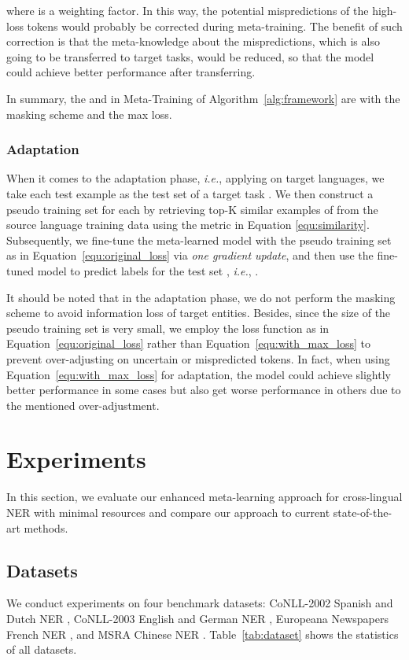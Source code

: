 \documentclass[letterpaper]{article} \usepackage{aaai20}  \usepackage{times}  \usepackage{helvet} \usepackage{courier}  \usepackage[hyphens]{url}  \usepackage{graphicx} \urlstyle{rm} \def\UrlFont{\rm}  \usepackage{graphicx}
\newcommand{\ie}{\textit{i.e.}}
\begin{document}
where  is a weighting factor. In this way, the potential mispredictions of the high-loss tokens would probably be corrected during meta-training. 
The benefit of such correction is that the meta-knowledge about the mispredictions, which is also going to be transferred to target tasks, would be reduced, so that the model could achieve better performance after transferring.

In summary, the  and  in Meta-Training of Algorithm~\ref{alg:framework} are with the masking scheme and the max loss.
\subsubsection{Adaptation}
When it comes to the adaptation phase, \ie, applying  on target languages, we take each test example  as the test set  of a target task . 
We then construct a pseudo training set  for each  by retrieving top-K similar examples of  from the source language training data  using the metric in Equation \ref{equ:similarity}. 
Subsequently, we fine-tune the meta-learned model  with the pseudo training set  as in Equation~\ref{equ:original_loss}  via \textit{one gradient update}, and then use the fine-tuned model to predict labels for the test set , \ie, . 

It should be noted that in the adaptation phase, we do not perform the masking scheme to avoid information loss of target entities. 
Besides, since the size of the pseudo training set is very small, we employ the loss function as in Equation~\ref{equ:original_loss} rather than Equation~\ref{equ:with_max_loss} to prevent over-adjusting on uncertain or mispredicted tokens. 
In fact, when using Equation~\ref{equ:with_max_loss} for adaptation, the model could achieve slightly better performance in some cases but also get worse performance in others due to the mentioned over-adjustment. \section{Experiments}
In this section, we evaluate our enhanced meta-learning approach for cross-lingual NER with minimal resources and compare our approach to current state-of-the-art methods.


\subsection{Datasets}
We conduct experiments on four benchmark datasets: CoNLL-2002 Spanish and Dutch NER \cite{tjong2002introduction}, CoNLL-2003 English and German NER \cite{tjong2003introduction},  Europeana Newspapers French NER \cite{neudecker2016corpus}, and MSRA Chinese NER \cite{cao2018adversarial}. 
Table~\ref{tab:dataset} shows the statistics of all datasets. 
\end{document}
